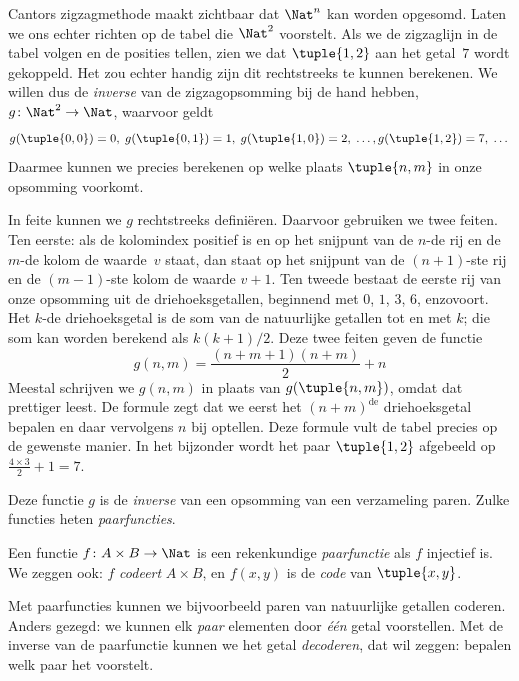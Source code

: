 \documentclass[../../../include/open-logic-section]{subfiles}
\begin{document}

\begin{explain}
Cantors zigzagmethode maakt zichtbaar dat $\Nat^n$ kan worden opgesomd. Laten
we ons echter richten op de tabel die $\Nat^2$ voorstelt. Als we de
zigzaglijn in de tabel volgen en de posities tellen, zien we dat
$\tuple{1,2}$ aan het getal~$7$ wordt gekoppeld. Het zou echter handig
zijn dit rechtstreeks te kunnen berekenen. We willen dus de
\emph{inverse} van de zigzagopsomming bij de hand hebben,
$g\colon \Nat^2 \to \Nat$, waarvoor geldt
\[
g(\tuple{0,0}) = 0, \;
g(\tuple{0,1}) = 1, \;
g(\tuple{1,0}) = 2, \; \dots,  
g(\tuple{1,2}) = 7, \; \dots
\]
Daarmee kunnen we precies berekenen op welke plaats $\tuple{n, m}$ in
onze opsomming voorkomt.

In feite kunnen we $g$ rechtstreeks definiëren. Daarvoor gebruiken we
twee feiten. Ten eerste: als de kolomindex positief is en op het
snijpunt van de $n$-de rij en de $m$-de kolom de waarde~$v$ staat, dan
staat op het snijpunt van de
$(n+1)$-ste rij en de $(m-1)$-ste kolom de waarde $v + 1$. Ten tweede
bestaat de eerste rij van onze opsomming uit de driehoeksgetallen,
beginnend met $0$, $1$, $3$, $6$, enzovoort. Het $k$-de
driehoeksgetal is de som van de natuurlijke getallen tot en met $k$; die som kan
worden berekend als $k(k+1)/2$. Deze twee feiten geven de functie
\[
  g(n,m) = \frac{(n+m+1)(n+m)}{2} + n
\]
Meestal schrijven we $g(n, m)$ in plaats van $g(\tuple{n, m})$, omdat
dat prettiger leest. De formule zegt dat we eerst het
$(n+m)^\text{de}$ driehoeksgetal bepalen en daar vervolgens $n$ bij
optellen. Deze formule vult de tabel precies op de gewenste manier. In het
bijzonder wordt het paar $\tuple{1, 2}$ afgebeeld op $\frac{4 \times 3}{2} +
1 = 7$.

Deze functie $g$ is de \emph{inverse} van een opsomming van een
verzameling paren. Zulke functies heten \emph{paarfuncties}.
\end{explain}

\begin{defn}[Paarfunctie]
  Een functie $f\colon A \times B \to \Nat$ is een rekenkundige
  \emph{paarfunctie} als $f$ injectief is. We zeggen ook: $f$
  \emph{codeert} $A \times B$, en $f(x,y)$ is de
  \emph{code} van $\tuple{x,y}$.
\end{defn}

\begin{explain}
Met paarfuncties kunnen we bijvoorbeeld paren van natuurlijke getallen
coderen. Anders gezegd: we kunnen elk \emph{paar} elementen door
\emph{één} getal voorstellen. Met de inverse van de paarfunctie
kunnen we het getal \emph{decoderen}, dat wil zeggen: bepalen welk paar
het voorstelt.
\end{explain}
\end{document}
